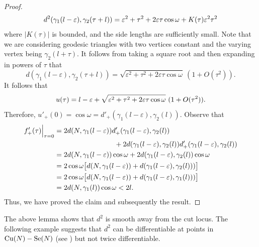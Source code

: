 \begin{proof}
    \begin{displaymath}
        d^2(\gamma_1(l-\varepsilon),\gamma_2(\tau+l))=\varepsilon^2+\tau^2+2\varepsilon\tau \cos \omega +K(\tau)\varepsilon^2\tau^2
    \end{displaymath}
    where $|K(\tau)|$ is bounded, and the side lengths are sufficiently small. Note that we are considering geodesic triangles with two vertices constant and the varying vertex being $\gamma_2(l+\tau)$. It follows from taking a square root and then expanding in powers of $\tau$ that
    \begin{displaymath}
        d(\gamma_1(l-\varepsilon),\gamma_2(\tau+l))=\sqrt{\varepsilon^2+\tau^2+2\varepsilon\tau\cos\omega}~(1+O(\tau^2)).
    \end{displaymath}
    It follows that 
    \begin{displaymath}
        u(\tau)=l-\varepsilon+\sqrt{\varepsilon^2+\tau^2+2\varepsilon\tau\cos\omega}~(1+O(\tau^2)).
    \end{displaymath} 
    Therefore, $u'_+(0)=\cos \omega=d'_+(\gamma_1(l-\varepsilon),\gamma_2(l))$. Observe that 
    \begin{align*}
        f'_+(\tau)\Big|_{\tau=0} & = 2d(N,\gamma_1(l-\varepsilon))d'_+(\gamma_1(l-\varepsilon),\gamma_2(l)) \\
        & \kern 3cm +2d(\gamma_1(l-\varepsilon),\gamma_2(l))d'_+(\gamma_1(l-
    \varepsilon),\gamma_2(l))\\
        & = 2d(N,\gamma_1(l-\varepsilon))\cos \omega+2d(\gamma_1(l-\varepsilon),\gamma_2(l))\cos\omega\\
		& = 2\cos \omega\big[ d(N,\gamma_1(l-\varepsilon))+d(\gamma_1(l-\varepsilon),\gamma_2(l))) \big]\\
		& = 2\cos\omega \big[ d(N,\gamma_1(l-\varepsilon))+d(\gamma_1(l-\varepsilon),\gamma_1(l))) \big] \\
        & =2d(N,\gamma_1(l))\cos\omega<2l.
    \end{align*}
    Thus, we have proved the claim and subsequently the result.
\end{proof}

\hf The above lemma shows that $d^2$ is smooth away from the cut locus. The following example suggests that $d^2$ can be differentiable at points in $\mathrm{Cu}(N) -\mathrm{Se}(N)$ (see ) but not twice differentiable.

